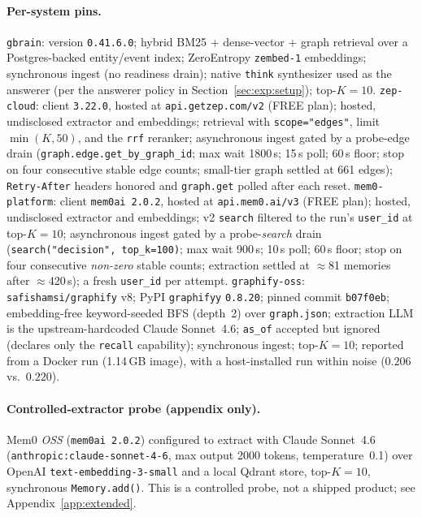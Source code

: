 \documentclass[11pt]{article}
\begin{document}
\paragraph{Per-system pins.}
\texttt{gbrain}: version \texttt{0.41.6.0}; hybrid BM25 + dense-vector + graph
retrieval over a Postgres-backed entity/event index; ZeroEntropy
\texttt{zembed-1} embeddings; synchronous ingest (no readiness drain); native
\texttt{think} synthesizer used as the answerer (per the answerer policy in
Section~\ref{sec:exp:setup}); top-$K=10$.
\texttt{zep-cloud}: client \texttt{3.22.0}, hosted at \texttt{api.getzep.com/v2}
(FREE plan); hosted, undisclosed extractor and embeddings; retrieval with
\texttt{scope="edges"}, limit $\min(K,50)$, and the \texttt{rrf} reranker;
asynchronous ingest gated by a probe-edge drain
(\texttt{graph.edge.get\_by\_graph\_id}; max wait 1800\,s; 15\,s poll; 60\,s
floor; stop on four consecutive stable edge counts; small-tier graph settled at
661 edges); \texttt{Retry-After} headers honored and \texttt{graph.get} polled
after each reset.
\texttt{mem0-platform}: client \texttt{mem0ai}~\texttt{2.0.2}, hosted at
\texttt{api.mem0.ai/v3} (FREE plan); hosted, undisclosed extractor and
embeddings; v2 \texttt{search} filtered to the run's \texttt{user\_id} at
top-$K=10$; asynchronous ingest gated by a probe-\emph{search} drain
(\texttt{search("decision", top\_k=100)}; max wait 900\,s; 10\,s poll; 60\,s
floor; stop on four consecutive \emph{non-zero} stable counts; extraction settled
at $\approx$81 memories after $\approx$420\,s); a fresh \texttt{user\_id} per
attempt.
\texttt{graphify-oss}: \texttt{safishamsi/graphify} v8; PyPI \texttt{graphifyy}
\texttt{0.8.20}; pinned commit \texttt{b07f0eb}; embedding-free keyword-seeded
BFS (depth~2) over \texttt{graph.json}; extraction LLM is the upstream-hardcoded
Claude Sonnet~4.6; \texttt{as\_of} accepted but ignored (declares only the
\texttt{recall} capability); synchronous ingest; top-$K=10$; reported from a
Docker run (1.14\,GB image), with a host-installed run within noise
($0.206$ vs.\ $0.220$).

\paragraph{Controlled-extractor probe (appendix only).}
Mem0 \emph{OSS} (\texttt{mem0ai}~\texttt{2.0.2}) configured to extract with
Claude Sonnet~4.6 (\texttt{anthropic:claude-sonnet-4-6}, max output 2000 tokens,
temperature~0.1) over OpenAI \texttt{text-embedding-3-small} and a local Qdrant
store, top-$K=10$, synchronous \texttt{Memory.add()}. This is a controlled probe,
not a shipped product; see Appendix~\ref{app:extended}.
\end{document}
